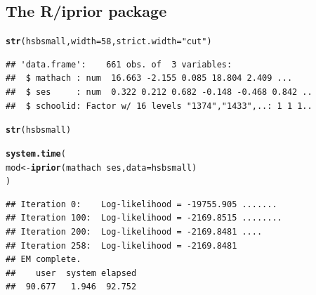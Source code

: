 \documentclass[]{beamer}\usepackage[]{graphicx}\usepackage[]{color}
\makeatletter
\newcommand{\hlnum}[1]{\textcolor[rgb]{0.686,0.059,0.569}{#1}}%
\newcommand{\hlstr}[1]{\textcolor[rgb]{0.192,0.494,0.8}{#1}}%
\newcommand{\hlopt}[1]{\textcolor[rgb]{0,0,0}{#1}}%
\newcommand{\hlstd}[1]{\textcolor[rgb]{0.345,0.345,0.345}{#1}}%
\newcommand{\hlkwb}[1]{\textcolor[rgb]{0.69,0.353,0.396}{#1}}%
\newcommand{\hlkwc}[1]{\textcolor[rgb]{0.333,0.667,0.333}{#1}}%
\newcommand{\hlkwd}[1]{\textcolor[rgb]{0.737,0.353,0.396}{\textbf{#1}}}%
\newenvironment{kframe}{%
 \def\at@end@of@kframe{}%
 \ifinner\ifhmode%
  \def\at@end@of@kframe{\end{minipage}}%
  \begin{minipage}{\columnwidth}%
 \fi\fi%
 \def\FrameCommand##1{\hskip\@totalleftmargin \hskip-\fboxsep
 \colorbox{shadecolor}{##1}\hskip-\fboxsep
     \hskip-\linewidth \hskip-\@totalleftmargin \hskip\columnwidth}%
 \MakeFramed {\advance\hsize-\width
   \@totalleftmargin\z@ \linewidth\hsize
   \@setminipage}}%
 {\par\unskip\endMakeFramed%
 \at@end@of@kframe}
\newenvironment{knitrout}{}{} %
\makeatother
\begin{document}
\subsection{The R/iprior package}


\newsavebox{\ipriordemoa}
\begin{lrbox}{\ipriordemoa}
\begin{knitrout}\small
{}\color{fgcolor}\begin{kframe}
\begin{alltt}
\hlkwd{str}\hlstd{(hsbsmall,} \hlkwc{width} \hlstd{=} \hlnum{58}\hlstd{,} \hlkwc{strict.width} \hlstd{=} \hlstr{"cut"}\hlstd{)}
\end{alltt}
\begin{verbatim}
## 'data.frame':	661 obs. of  3 variables:
##  $ mathach : num  16.663 -2.155 0.085 18.804 2.409 ...
##  $ ses     : num  0.322 0.212 0.682 -0.148 -0.468 0.842 ..
##  $ schoolid: Factor w/ 16 levels "1374","1433",..: 1 1 1..
\end{verbatim}
\end{kframe}
\end{knitrout}
\end{lrbox}

\newsavebox{\ipriordemoaa}
\begin{lrbox}{\ipriordemoaa}
\begin{knitrout}\small
{}\color{fgcolor}\begin{kframe}
\begin{alltt}
\hlkwd{str}\hlstd{(hsbsmall)}
\end{alltt}
\end{kframe}
\end{knitrout}
\end{lrbox}

\newsavebox{\ipriordemob}
\begin{lrbox}{\ipriordemob}
\begin{knitrout}\small
{}\color{fgcolor}\begin{kframe}
\begin{alltt}
\hlkwd{system.time}\hlstd{(}
  \hlstd{mod} \hlkwb{<-} \hlkwd{iprior}\hlstd{(mathach} \hlopt{~} \hlstd{ses,} \hlkwc{data} \hlstd{= hsbsmall)}
\hlstd{)}
\end{alltt}
\begin{verbatim}
## Iteration 0:    Log-likelihood = -19755.905 .......
## Iteration 100:  Log-likelihood = -2169.8515 ........
## Iteration 200:  Log-likelihood = -2169.8481 ....
## Iteration 258:  Log-likelihood = -2169.8481 
## EM complete.
##    user  system elapsed 
##  90.677   1.946  92.752
\end{verbatim}
\end{kframe}
\end{knitrout}
\end{lrbox}
\end{document}
